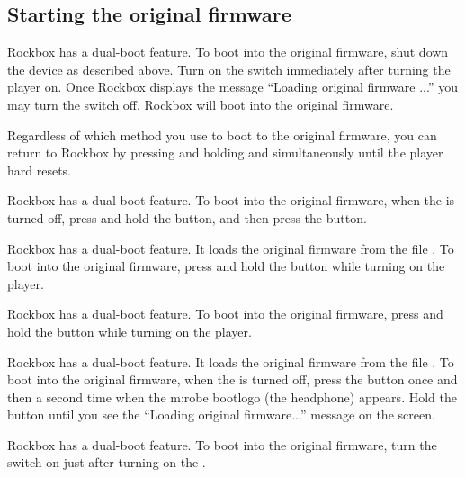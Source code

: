   {
  \subsection{Starting the original firmware}
  \label{ref:Dualboot}
    {
    Rockbox has a dual-boot feature. To boot into the original firmware, shut
    down the device as described above. Turn on the \ButtonHold{} switch
    immediately after turning the player on. Once Rockbox displays the
    message ``Loading original firmware ...'' you may turn the \ButtonHold{}
    switch off. Rockbox will boot into the original firmware.
    
    
    Regardless of which method you use to boot to the original firmware, you can
    return to Rockbox by pressing and holding \ButtonMenu{} and \ButtonSelect{}
    simultaneously until the player hard resets.
    }

    {
    Rockbox has a dual-boot feature. To boot into the original firmware,
    when the \dap{} is turned off, press and hold the \ButtonRec{} button,
    and then press the \ButtonOn{} button.
    }

    {
    Rockbox has a dual-boot feature. It loads the original firmware from
    the file . To boot into the original firmware,
    press and hold the \ButtonLeft{} button while turning on the player.
    }
    
    {
    Rockbox has a dual-boot feature. To boot into the original firmware,
    press and hold the \ButtonLeft{} button while turning on the player.
    }

    {
    Rockbox has a dual-boot feature. It loads the original firmware from
    the file . To boot into the original firmware,
    when the \dap{} is turned off, press the \ButtonPower{} button once and then 
    a second time when the m:robe bootlogo (the headphone) appears. Hold the
    \ButtonPower{} button until you see the ``Loading original firmware...'' 
    message on the screen.
    }

    {
    Rockbox has a dual-boot feature. To boot into the original firmware,
    turn the \ButtonHold{} switch on just after turning on the \dap{}.
    }

  }
